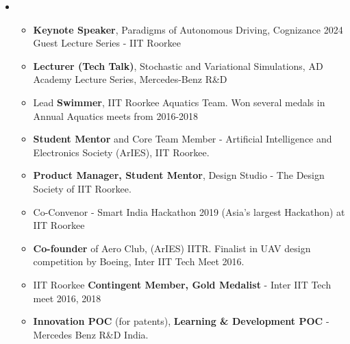 \documentclass[letterpaper,11pt]{article}
\newcommand{\resumeItem}[1]{
  \item\small{
    {#1 \vspace{-2pt}}
  }
}
\newcommand{\resumeSubHeadingListStart}{\begin{itemize}[leftmargin=0.0in, label={}]}
\newcommand{\resumeSubHeadingListEnd}{\end{itemize}}
\newcommand{\resumeItemListStart}{\begin{itemize}}
\newcommand{\resumeItemListEnd}{\end{itemize}\vspace{-5pt}}
\begin{document}
    \resumeSubHeadingListStart
        \item
          \resumeItemListStart
            \resumeItem{\textbf{Keynote Speaker}, Paradigms of Autonomous Driving, Cognizance 2024 Guest Lecture Series - IIT Roorkee}
            \resumeItem{\textbf{Lecturer (Tech Talk)}, Stochastic and Variational Simulations, AD Academy Lecture Series, Mercedes-Benz R\&D}
            \resumeItem{Lead \textbf{Swimmer}, IIT Roorkee Aquatics Team. Won several medals in Annual Aquatics meets from 2016-2018}
            \resumeItem{\textbf{Student Mentor} and Core Team Member - Artificial Intelligence and Electronics Society (ArIES), IIT Roorkee.}
            \resumeItem{\textbf{Product Manager, Student Mentor}, Design Studio - The Design Society of IIT Roorkee.}
            \resumeItem{Co-Convenor - Smart India Hackathon 2019 (Asia's largest Hackathon) at IIT Roorkee}
            \resumeItem{\textbf{Co-founder} of Aero Club, (ArIES) IITR. Finalist in UAV design competition by Boeing, Inter IIT Tech Meet 2016.}
            \resumeItem{IIT Roorkee \textbf{Contingent Member, Gold Medalist} - Inter IIT Tech meet 2016, 2018}
            \resumeItem{\textbf{Innovation POC} (for patents), \textbf{Learning \& Development POC} - Mercedes Benz R\&D India.}
            
          \resumeItemListEnd
          
    \resumeSubHeadingListEnd

 \vspace{-8pt}



\end{document}
